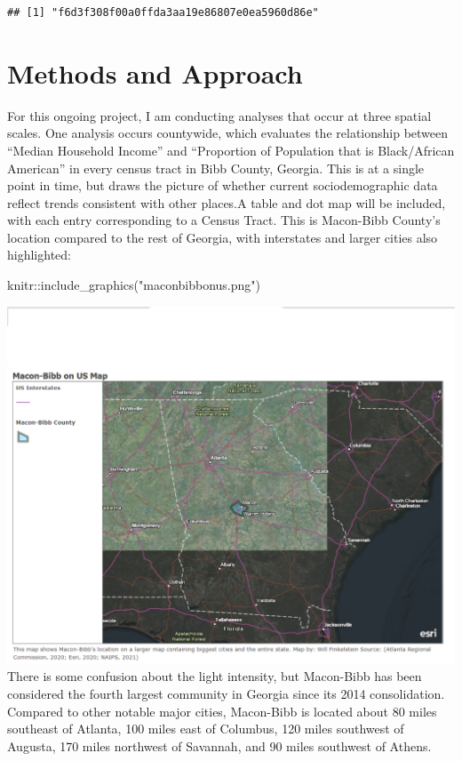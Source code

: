 \documentclass[
]{article}
\newenvironment{Shaded}{\begin{snugshade}}{\end{snugshade}}
\newcommand{\FunctionTok}[1]{\textcolor[rgb]{0.00,0.00,0.00}{#1}}
\newcommand{\NormalTok}[1]{#1}
\newcommand{\SpecialCharTok}[1]{\textcolor[rgb]{0.00,0.00,0.00}{#1}}
\newcommand{\StringTok}[1]{\textcolor[rgb]{0.31,0.60,0.02}{#1}}
\begin{document}
\begin{verbatim}
## [1] "f6d3f308f00a0ffda3aa19e86807e0ea5960d86e"
\end{verbatim}

\hypertarget{methods-and-approach}{%
\section{Methods and Approach}\label{methods-and-approach}}

For this ongoing project, I am conducting analyses that occur at three
spatial scales. One analysis occurs countywide, which evaluates the
relationship between ``Median Household Income'' and ``Proportion of
Population that is Black/African American'' in every census tract in
Bibb County, Georgia. This is at a single point in time, but draws the
picture of whether current sociodemographic data reflect trends
consistent with other places.A table and dot map will be included, with
each entry corresponding to a Census Tract. This is Macon-Bibb County's
location compared to the rest of Georgia, with interstates and larger
cities also highlighted:

\begin{Shaded}
\begin{Highlighting}[]
\NormalTok{knitr}\SpecialCharTok{::}\FunctionTok{include\_graphics}\NormalTok{(}\StringTok{"maconbibbonus.png"}\NormalTok{)}
\end{Highlighting}
\end{Shaded}

\includegraphics{maconbibbonus.png} There is some confusion about the
light intensity, but Macon-Bibb has been considered the fourth largest
community in Georgia since its 2014 consolidation. Compared to other
notable major cities, Macon-Bibb is located about 80 miles southeast of
Atlanta, 100 miles east of Columbus, 120 miles southwest of Augusta, 170
miles northwest of Savannah, and 90 miles southwest of Athens.
\end{document}
